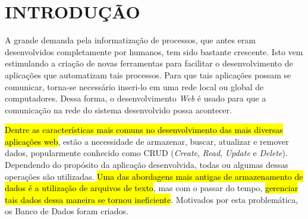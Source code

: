 \chapter{INTRODUÇÃO}
\label{Introducao}

A grande demanda pela informatização de processos, que antes eram desenvolvidos completamente por humanos, tem sido bastante crescente. Isto vem estimulando a criação de novas ferramentas para facilitar o desenvolvimento de aplicações que automatizam tais processos. Para que tais aplicações possam se comunicar, torna-se necessário inseri-lo em uma rede local ou global de computadores. Dessa forma, o desenvolvimento \textit{Web} é usado para que a comunicação na rede do sistema desenvolvido possa acontecer.




\hl{Dentre as características mais comuns no desenvolvimento das mais diversas aplicações web}, estão a necessidade de armazenar, buscar, atualizar e remover dados, popularmente conhecido como CRUD (\textit{Create}, \textit{Read}, \textit{Update} e \textit{Delete}). Dependendo do propósito da aplicação desenvolvida, todas ou algumas dessas operações são utilizadas. \hl{Uma das abordagens mais antigas de armazenamento de dados é a utilização de arquivos de texto}, mas com o passar do tempo, \hl{gerenciar tais dados dessa maneira se tornou ineficiente}. Motivados por esta problemática, os Banco de Dados foram criados.





